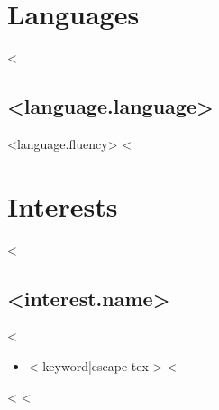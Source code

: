 \documentclass{resume}
\begin{document}
\section{Languages}
\begin{multicols}{2}
<%
\subsection{<{language.language}>}
<{language.fluency}>
<%
\end{multicols}
\section{Interests}
<%
\subsection{<{interest.name}>}
<%
\begin{itemize}
  \setlength\itemsep{0.1em}
  <%
\item <{ keyword|escape-tex }>
  <%
\end{itemize}
\vspace{0.5em}
<%
<%
\end{document}

